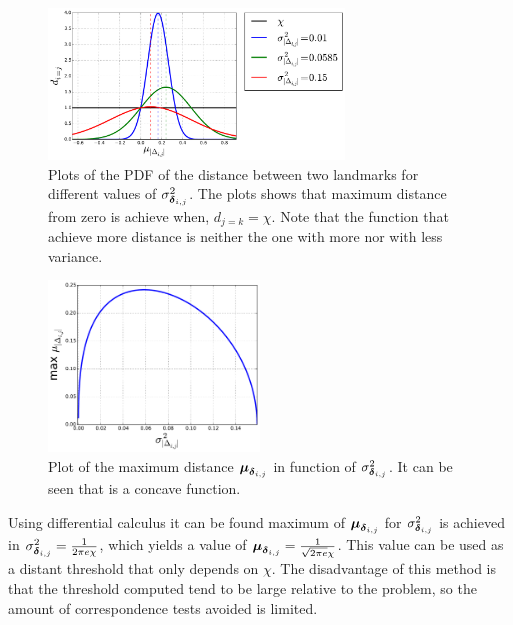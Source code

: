 \begin{figure}[htbp!]
    \centering
    \includegraphics[width=0.7\textwidth]{imagenes/maxDistance.pdf}
    \caption[Plots of the PDF of the distance between two landmarks.]{Plots of the PDF of the distance between two landmarks for different values of $\sigma_{\bs{\delta}_{i,j}}^2$. The plots shows that maximum distance from zero is achieve when, $d_{j=k}=\chi$. Note that the function that achieve more distance is neither the one with more nor with less variance.}
    \label{fig:max-distance}
\end{figure}

\begin{figure}[htbp!]
    \centering
    \includegraphics[width=0.5\textwidth]{imagenes/maxVariance.pdf}
    \caption[Plot of the maximum distance $\bs{\mu}_{\bs{\delta}_{i,j}}$ in function of $\sigma_{\bs{\delta}_{i,j}}^2$.]{Plot of the maximum distance $\bs{\mu}_{\bs{\delta}_{i,j}}$ in function of $\sigma_{\bs{\delta}_{i,j}}^2$. It can be seen that is a concave function.}
    \label{fig:max-variance}
\end{figure}

Using differential calculus it can be found maximum of $\bs{\mu}_{\bs{\delta}_{i,j}}$ for $\sigma_{\bs{\delta}_{i,j}}^2$ is achieved in $\sigma_{\boldsymbol{\delta}_{i,j}}^2 = \frac{1}{2\pi e\chi}$, which yields a value of $\boldsymbol{\mu}_{\boldsymbol{\delta}_{i,j}} = \frac{1}{\sqrt{2\pi e}\chi}$.  
This value can be used as a distant threshold that only depends on $\chi$. The disadvantage of this method is that the threshold computed tend to be large relative to the problem, so the amount of correspondence tests avoided is limited.

